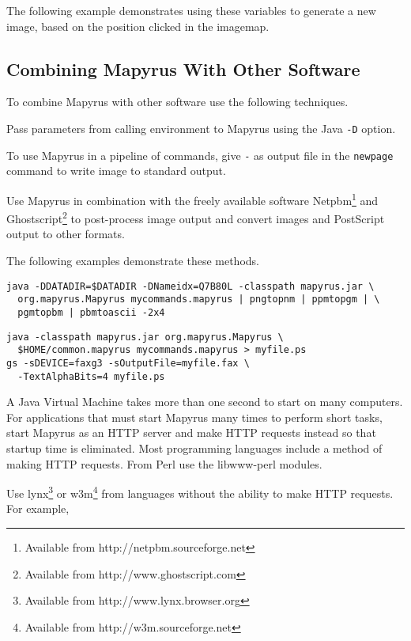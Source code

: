 The following example demonstrates
using these variables to generate a new image, based on the
position clicked in the imagemap.



\subsection{Combining Mapyrus With Other Software}

To combine Mapyrus with other software use the following
techniques.

Pass parameters from calling environment to Mapyrus using the Java
\texttt{-D} option.

To use Mapyrus in a pipeline of commands,
give \texttt{-} as output file in the
\texttt{newpage}
command to write image to standard output.

Use Mapyrus in combination with the freely available software
Netpbm\footnote{Available from http://netpbm.sourceforge.net} and
Ghostscript\footnote{Available from http://www.ghostscript.com} to post-process
image output and convert images and PostScript output to other formats.

The following examples demonstrate these methods.

\begin{verbatim}
java -DDATADIR=$DATADIR -DNameidx=Q7B80L -classpath mapyrus.jar \
  org.mapyrus.Mapyrus mycommands.mapyrus | pngtopnm | ppmtopgm | \
  pgmtopbm | pbmtoascii -2x4
\end{verbatim}

\begin{verbatim}
java -classpath mapyrus.jar org.mapyrus.Mapyrus \
  $HOME/common.mapyrus mycommands.mapyrus > myfile.ps
gs -sDEVICE=faxg3 -sOutputFile=myfile.fax \
  -TextAlphaBits=4 myfile.ps
\end{verbatim}

A Java Virtual Machine takes more than one second to start on many computers.
For applications that must start Mapyrus many times to perform short tasks,
start Mapyrus as an HTTP server and make HTTP requests instead so that
startup time is eliminated.
Most programming languages include a method of making HTTP requests.
From Perl use the libwww-perl modules.

Use lynx\footnote{Available from http://www.lynx.browser.org} or
w3m\footnote{Available from http://w3m.sourceforge.net}
from languages without the ability to make
HTTP requests.  For example,

